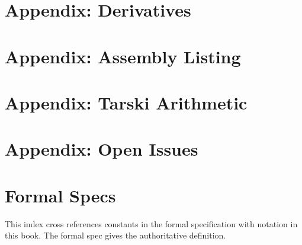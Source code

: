 \documentclass[cup9a]{cupbook}
\begin{document}

    
    \label{part:appendix}
    \chapter{Appendix: Derivatives}
    \chapter{Appendix: Assembly Listing}
    
    \chapter{Appendix: Tarski Arithmetic}
     
    
    \chapter{Appendix: Open Issues} %
    






\backmatter

\theendnotes



\setcounter{chapter}{0}

\chapter{Formal Specs}
This index cross references constants in the formal specification with notation in this book.  The formal spec gives the authoritative definition.
\bigskip






\end{document}
